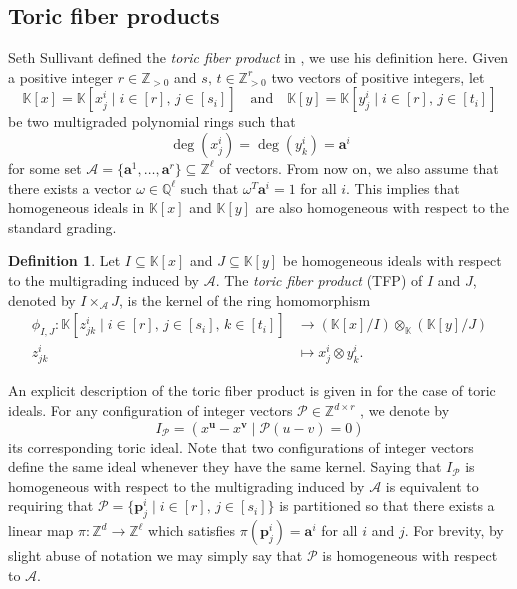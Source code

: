 \documentclass[12pt,reqno]{amsart}   	%
\theoremstyle{plain}
\theoremstyle{definition}
\newtheorem{definition}[theorem]{Definition}
\theoremstyle{remark}
\newcommand{\Z}{\mathbb{Z}}
\begin{document}
\subsection{Toric fiber products}
Seth Sullivant defined the \textit{toric fiber product} in \cite{Sullivant2007}, we use his definition here. Given a positive integer $r \in \Z_{>0}$ and $s,\,t \in \Z^r_{>0}$ two vectors of positive integers, let
\[
\mathbb{K}[x] = \mathbb{K}[x^i_j \mid i \in [r],\, j \in [s_i]]
\quad
\text{and}
\quad
\mathbb{K}[y] = \mathbb{K}[y^i_j \mid i \in [r],\, j \in [t_i]]
\]
be two multigraded polynomial rings such that
\[
\deg(x^i_j) = \deg(y^i_k) = \mathbf{a}^i 
\]
for some set $\mathcal{A} = \{\mathbf{a}^1,\dots,\mathbf{a}^r\} \subseteq \Z^{\ell}$ of vectors. From now on, we also assume that there exists a vector $\omega \in \mathbb{Q}^{\ell}$ such that $\omega^T \mathbf{a}^i = 1$ for all $i$. This implies that homogeneous ideals in $\mathbb{K}[x]$ and $\mathbb{K}[y]$ are also homogeneous with respect to the standard grading.

\begin{definition}
    Let $I \subseteq \mathbb{K}[x]$ and $J \subseteq \mathbb{K}[y]$ be homogeneous ideals with respect to the multigrading induced by $\mathcal{A}$. The \textit{toric fiber product} (TFP) of $I$ and $J$, denoted by $I \times_{\mathcal{A}} J$, is the kernel of the ring homomorphism
    \begin{align*}
        \phi_{I,J}: \mathbb{K}[z^i_{jk}\mid i \in [r],\, j \in [s_i],\, k \in [t_i]] &\longrightarrow \left( \mathbb{K}[x]/I \right) \otimes_{\mathbb{K}} \left( \mathbb{K}[y]/J \right) \\
        z^i_{jk} &\longmapsto x^i_j \otimes y^i_k.
    \end{align*}
\end{definition}
An explicit description of the toric fiber product is given in \cite{engstrom2014} for the case of toric ideals.
For any configuration of integer vectors $\mathcal{P} \in \Z^{d \times r}$ , we denote by
\[
I_{\mathcal{P}} = (x^{\mathbf{u}}-x^{\mathbf{v}}\mid \mathcal{P}(u-v)=0)
\]
its corresponding toric ideal. Note that two configurations of integer vectors define the same ideal whenever they have the same kernel. Saying that $I_{\mathcal{P}}$ is homogeneous with respect to the multigrading induced by $\mathcal{A}$ is equivalent to requiring that $\mathcal{P} = \{\mathbf{p}^i_j \mid i \in [r],\,j \in [s_i]\}$ is partitioned so that there exists a linear map $\pi: \Z^d %
\to \Z^{\ell}$ which satisfies $\pi(\mathbf{p}^i_j)=\mathbf{a}^i$ for all $i$ and $j$. For brevity, by slight abuse of notation we may simply say that $\mathcal{P}$ is homogeneous with respect to $\mathcal{A}$.
\end{document}
